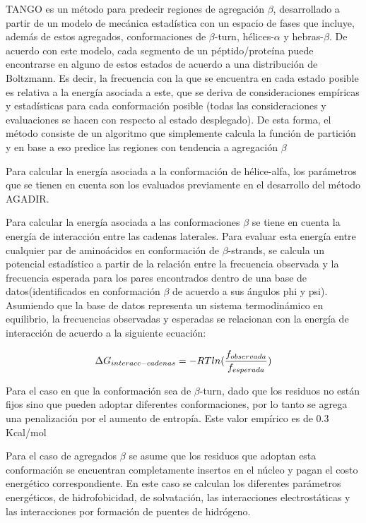 TANGO\cite{fernandez2004prediction} es un método para predecir regiones de agregación $\beta$, desarrollado a partir de un modelo de mecánica estadística con
un espacio de fases que incluye, además de estos agregados, conformaciones de $\beta$-turn, hélices-$\alpha$ y hebras-$\beta$.
De acuerdo con este modelo, cada segmento de un péptido/proteína puede encontrarse en alguno de estos estados de acuerdo a una distribución de Boltzmann. 
Es decir, la frecuencia con la que se encuentra en cada estado posible es relativa a la energía asociada a este, que se deriva de consideraciones empíricas y estadísticas para cada conformación posible
(todas las consideraciones y evaluaciones se hacen con respecto al estado desplegado).
De esta forma, el método consiste de un algoritmo que simplemente calcula la función de partición y en base a eso predice las regiones con tendencia a agregación $\beta$

Para calcular la energía asociada a la conformación de hélice-alfa, los parámetros que se tienen en cuenta son los evaluados previamente en el desarrollo del método AGADIR\cite{lacroix1998elucidating}.

Para calcular la energía asociada a las conformaciones $\beta$ se tiene en cuenta la energía de interacción entre las cadenas laterales.
Para evaluar esta energía entre 
cualquier par de aminoácidos en conformación de $\beta$-strands, se calcula un potencial estadístico a partir de la relación 
entre la frecuencia observada y la frecuencia esperada para los pares encontrados dentro de una base de datos(identificados en conformación $\beta$ de acuerdo a sus ángulos phi y psi).
Asumiendo que la base de datos representa un sistema termodinámico en equilibrio, la frecuencias observadas y esperadas se relacionan con la energía de interacción de acuerdo a la siguiente ecuación:

\begin{equation}
\large
 \Delta G_{interacc-cadenas}=-RTln(\frac{f_{observada}}{f_{esperada}})
\end{equation}

Para el caso en que la conformación sea de $\beta$-turn, dado que los residuos no están fijos sino que pueden adoptar diferentes conformaciones, por lo tanto se agrega una penalización por el aumento de entropía.
Este valor empírico es de 0.3 Kcal/mol

Para el caso de agregados $\beta$ se asume que los residuos que adoptan esta conformación se encuentran completamente insertos en el núcleo y pagan el costo energético correspondiente. 
En este caso se calculan los diferentes parámetros energéticos, de hidrofobicidad, de solvatación, las interacciones electrostáticas y las interacciones por formación de puentes de hidrógeno.

